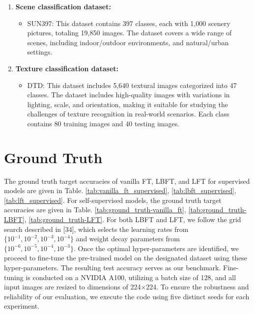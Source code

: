 \begin{enumerate}
    \item \textbf{Scene classification dataset:}
    \begin{itemize}
    \vspace{1em}
        \item SUN397: This dataset contains 397 classes, each with 1,000 scenery pictures, totaling 19,850 images. The dataset covers a wide range of scenes, including indoor/outdoor environments, and natural/urban settings.
    \end{itemize}
    
    \item \textbf{Texture classification dataset:}
    \begin{itemize}
    \vspace{1em}
        \item DTD: This dataset includes 5,640 textural images categorized into 47 classes. The dataset includes high-quality images with variations in lighting, scale, and orientation, making it suitable for studying the challenges of texture recognition in real-world scenarios. Each class contains 80 training images and 40 testing images.
    \end{itemize}
\end{enumerate}


\section{Ground Truth}

The ground truth target accuracies of vanilla FT, LBFT, and LFT for supervised models are given in Table. \ref{tab:vanilla_ft_supervised}, \ref{tab:lbft_supervised}, \ref{tab:lft_supervised}. For self-supervised models, the ground truth target accuracies are given in Table. \ref{tab:ground_truth-vanilla_ft}, \ref{tab:ground_truth-LBFT}, \ref{tab:ground_truth-LFT}. For both LBFT and LFT, we follow the grid search described in [34], which selects the learning rates from $\{10^{-1}, 10^{-2}, 10^{-3}, 10^{-4}\}$ and weight decay parameters from $\{10^{-6}, 10^{-5}, 10^{-4}, 10^{-3}\}$. Once the optimal hyper-parameters are identified, we proceed to fine-tune the pre-trained model on the designated dataset using these hyper-parameters. The resulting test accuracy serves as our benchmark. Fine-tuning is conducted on a NVIDIA A100, utilizing a batch size of 128, and all input images are resized to dimensions of 224×224.  To ensure the robustness and reliability of our evaluation, we execute the code using five distinct seeds for each experiment.

